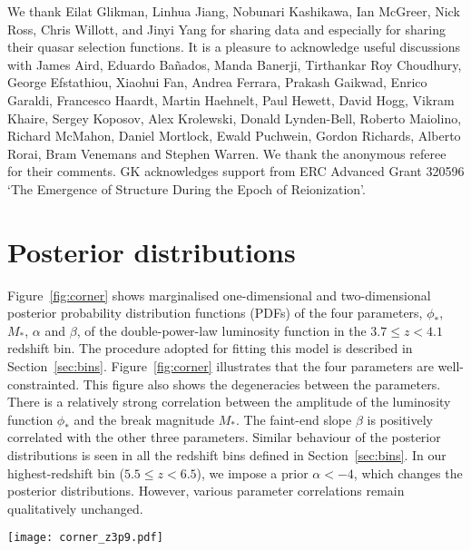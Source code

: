 \documentclass[fleqn,usenatbib]{mnras}
\newcommand{\new}[1]{{\color{notecolor} #1}}
\begin{document}
We thank Eilat Glikman, Linhua Jiang, Nobunari Kashi\-kawa, Ian
McGreer, Nick Ross, Chris Willott, and Jinyi Yang for sharing data and
especially for sharing their quasar selection functions.  It is a
pleasure to acknowledge useful discussions with James Aird, Eduardo
Ba\~nados, Manda Banerji, Tirthankar Roy Choudhury, George Efstathiou,
Xiaohui Fan, Andrea Ferrara, Prakash Gaikwad, Enrico Garaldi,
Francesco Haardt, Martin Haehnelt, Paul Hewett, David Hogg, Vikram
Khaire, Sergey Koposov, Alex Krolewski, Donald Lynden-Bell, Roberto
Maiolino, Richard McMahon, Daniel Mortlock, Ewald Puchwein, Gordon
Richards, Alberto Rorai, Bram Venemans and Stephen Warren.  \new{We
  thank the anonymous referee for their comments.} GK acknowledges
support from ERC Advanced Grant 320596 `The Emergence of Structure
During the Epoch of Reionization'.

\appendix

\section{Posterior distributions}

Figure~\ref{fig:corner} shows marginalised one-dimensional and
two-dimensional posterior probability distribution functions (PDFs) of
the four parameters, $\phi_*$, $M_*$, $\alpha$ and $\beta$, of the
double-power-law luminosity function in the $3.7\leq z < 4.1$ redshift
bin.  The procedure adopted for fitting this model is described in
Section~\ref{sec:bins}.  Figure~\ref{fig:corner} illustrates that the
four parameters are well-constrainted.  This figure also shows the
degeneracies between the parameters.  There is a relatively strong
correlation between the amplitude of the luminosity function $\phi_*$
and the break magnitude $M_*$.  The faint-end slope $\beta$ is
positively correlated with the other three parameters.  Similar
behaviour of the posterior distributions is seen in all the redshift
bins defined in Section~\ref{sec:bins}.  In our highest-redshift bin
($5.5\leq z < 6.5$), we impose a prior $\alpha < -4$, which changes
the posterior distributions.  However, various parameter correlations
remain qualitatively unchanged.

\begin{figure*}
  \begin{center}
    \texttt{[image: corner\_z3p9.pdf]}
  \end{center}
  \caption{Posterior distributions of the four double-power-law
    parameters in the $3.7\leq z < 4.1$ redshift bin.  The blue
    squares indicate median values.  Similar behaviour of the
    posterior distributions is seen in all other redshift bins defined
    in Section~\ref{sec:bins}.
    \label{fig:corner}}
\end{figure*}
\end{document}
